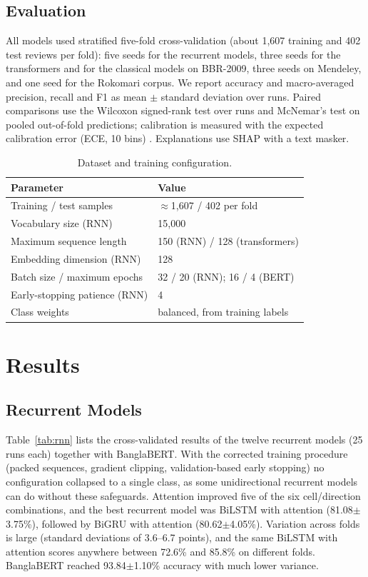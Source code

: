 \documentclass[journal]{IEEEtran}
\newcommand{\pmstd}[2]{#1$\pm$#2}
\begin{document}
\subsection{Evaluation}
All models used stratified five-fold cross-validation (about 1{,}607 training and 402 test reviews per fold): five seeds for the recurrent models, three seeds for the transformers and for the classical models on BBR-2009, three seeds on Mendeley, and one seed for the Rokomari corpus. We report accuracy and macro-averaged precision, recall and F1 as mean $\pm$ standard deviation over runs. Paired comparisons use the Wilcoxon signed-rank test over runs and McNemar's test \cite{mcnemar1947} on pooled out-of-fold predictions; calibration is measured with the expected calibration error (ECE, 10 bins) \cite{guo2017}. Explanations use SHAP \cite{lundberg2017} with a text masker.

\begin{table}[t]
\centering
\caption{Dataset and training configuration.}
\label{tab:config}
\small
\begin{tabular}{ll}
\toprule
Parameter & Value \\
\midrule
Training / test samples & $\approx$1{,}607 / 402 per fold \\
Vocabulary size (RNN) & 15{,}000 \\
Maximum sequence length & 150 (RNN) / 128 (transformers) \\
Embedding dimension (RNN) & 128 \\
Batch size / maximum epochs & 32 / 20 (RNN); 16 / 4 (BERT) \\
Early-stopping patience (RNN) & 4 \\
Class weights & balanced, from training labels \\
\bottomrule
\end{tabular}
\end{table}

\section{Results}\label{sec:results}
\subsection{Recurrent Models}
Table~\ref{tab:rnn} lists the cross-validated results of the twelve recurrent models (25 runs each) together with BanglaBERT. With the corrected training procedure (packed sequences, gradient clipping, validation-based early stopping) no configuration collapsed to a single class, as some unidirectional recurrent models can do without these safeguards. Attention improved five of the six cell/direction combinations, and the best recurrent model was BiLSTM with attention (\pmstd{81.08}{3.75}\%), followed by BiGRU with attention (\pmstd{80.62}{4.05}\%). Variation across folds is large (standard deviations of 3.6--6.7 points), and the same BiLSTM with attention scores anywhere between 72.6\% and 85.8\% on different folds. BanglaBERT reached \pmstd{93.84}{1.10}\% accuracy with much lower variance.
\end{document}
